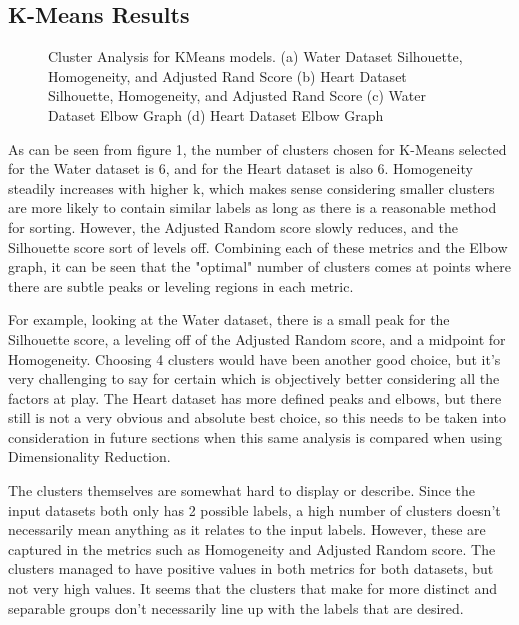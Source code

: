 \documentclass[
	letterpaper, %
]{mlreport}
\begin{document}
\subsection{K-Means Results}
\begin{figure}
	\centering
	\caption{Cluster Analysis for KMeans models. (a) Water Dataset Silhouette, Homogeneity, and Adjusted Rand Score (b) Heart Dataset Silhouette, Homogeneity, and Adjusted Rand Score (c) Water Dataset Elbow Graph (d) Heart Dataset Elbow Graph}
	\label{fig:fig1}
\end{figure}
As can be seen from figure 1, the number of clusters chosen for K-Means selected for the Water dataset is 6, and for the Heart dataset is also 6. Homogeneity steadily increases with higher k, which makes sense considering smaller clusters are more likely to contain similar labels as long as there is a reasonable method for sorting. However, the Adjusted Random score slowly reduces, and the Silhouette score sort of levels off. Combining each of these metrics and the Elbow graph, it can be seen that the "optimal" number of clusters comes at points where there are subtle peaks or leveling regions in each metric.

For example, looking at the Water dataset, there is a small peak for the Silhouette score, a leveling off of the Adjusted Random score, and a midpoint for Homogeneity. Choosing 4 clusters would have been another good choice, but it's very challenging to say for certain which is objectively better considering all the factors at play. The Heart dataset has more defined peaks and elbows, but there still is not a very obvious and absolute best choice, so this needs to be taken into consideration in future sections when this same analysis is compared when using Dimensionality Reduction.

The clusters themselves are somewhat hard to display or describe. Since the input datasets both only has 2 possible labels, a high number of clusters doesn't necessarily mean anything as it relates to the input labels. However, these are captured in the metrics such as Homogeneity and Adjusted Random score. The clusters managed to have positive values in both metrics for both datasets, but not very high values. It seems that the clusters that make for more distinct and separable groups don't necessarily line up with the labels that are desired.
\end{document}
